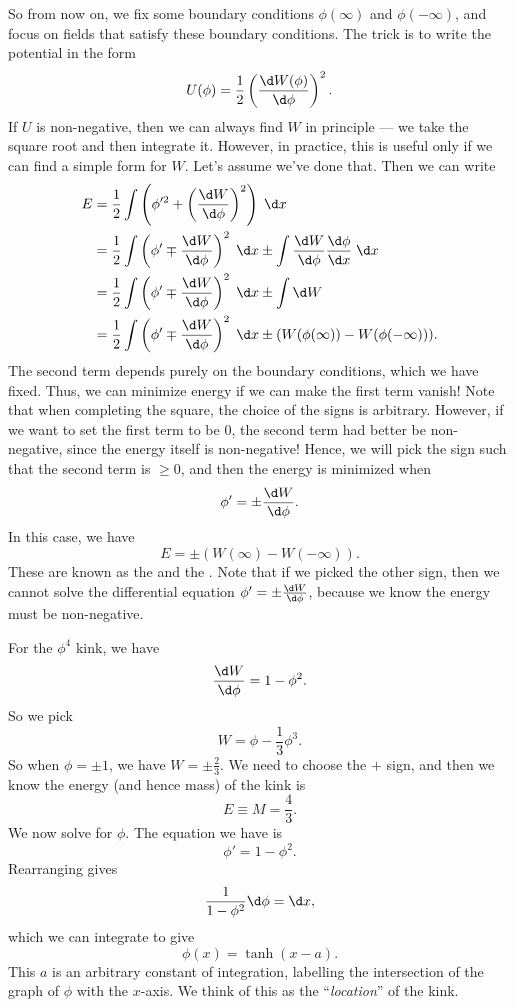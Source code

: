 \documentclass[a4paper]{article}
\begin{document}
So from now on, we fix some boundary conditions $\phi(\infty)$ and $\phi(-\infty)$, and focus on fields that satisfy these boundary conditions. The trick is to write the potential in the form
\[
  U (\phi) = \frac{1}{2} \left(\frac{\d W (\phi)}{\d \phi}\right)^2.
\]
If $U$ is non-negative, then we can always find $W$ in principle --- we take the square root and then integrate it. However, in practice, this is useful only if we can find a simple form for $W$. Let's assume we've done that. Then we can write
\begin{align*}
  E &= \frac{1}{2} \int \left(\phi'^2 + \left(\frac{\d W}{\d \phi}\right)^2 \right)\;\d x\\
  &= \frac{1}{2} \int \left(\phi' \mp \frac{\d W}{\d \phi}\right)^2\;\d x \pm \int \frac{\d W}{\d \phi} \frac{\d \phi}{\d x} \;\d x\\
  &= \frac{1}{2} \int \left(\phi' \mp \frac{\d W}{\d \phi}\right)^2\;\d x \pm \int \d W\\
  &= \frac{1}{2} \int \left(\phi' \mp \frac{\d W}{\d \phi}\right)^2\;\d x \pm (W(\phi(\infty)) - W(\phi(-\infty))).
\end{align*}
The second term depends purely on the boundary conditions, which we have fixed. Thus, we can minimize energy if we can make the first term vanish! Note that when completing the square, the choice of the signs is arbitrary. However, if we want to set the first term to be $0$, the second term had better be non-negative, since the energy itself is non-negative! Hence, we will pick the sign such that the second term is $\geq 0$, and then the energy is minimized when
\[
  \phi' = \pm \frac{\d W}{\d \phi}.
\]
In this case, we have
\[
  E = \pm (W(\infty) - W(-\infty)).
\]
These are known as the  and the . Note that if we picked the other sign, then we cannot solve the differential equation $\phi' = \pm \frac{\d W}{\d \phi}$, because we know the energy must be non-negative.

For the $\phi^4$ kink, we have
\[
  \frac{\d W}{\d \phi} = 1 - \phi^2.
\]
So we pick
\[
  W = \phi - \frac{1}{3} \phi^3.
\]
So when $\phi = \pm 1$, we have $W = \pm \frac{2}{3}$. We need to choose the $+$ sign, and then we know the energy (and hence mass) of the kink is
\[
  E \equiv M = \frac{4}{3}.
\]
We now solve for $\phi$. The equation we have is
\[
  \phi' = 1 - \phi^2.
\]
Rearranging gives
\[
  \frac{1}{1 - \phi^2} \d \phi = \d x,
\]
which we can integrate to give
\[
  \phi (x) = \tanh (x - a).
\]
This $a$ is an arbitrary constant of integration, labelling the intersection of the graph of $\phi$ with the $x$-axis. We think of this as the ``\emph{location}'' of the kink.
\end{document}
